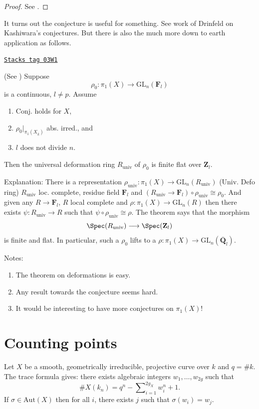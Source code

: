 \begin{proof}
See \cite{Gaitsgory}.
\end{proof}

It turns out the conjecture is useful for something.
See work of Drinfeld on Kashiwara's conjectures. But there is also
the much more down to earth application as follows.

\begin{theorem}
\label{trace-theorem-deformation-rings}
\href{https://stacks.math.columbia.edu/tag/03W1}{\texttt{Stacks tag 03W1}}

(See \cite[Theorem 3.5]{dJ-conjecture})
Suppose
$$
\rho_0: \pi_1(X)\to \text{GL}_n(\mathbf{F}_l)
$$
is a continuous, $l\neq p$. Assume
\begin{enumerate}
\item Conj. holds for $X$,
\item $\rho_0 |_{\pi_1(X_{\overline{k}})}$ abs. irred., and
\item $l$ does not divide $n$.
\end{enumerate}
Then the universal deformation ring $R_{\text{univ}}$ of $\rho_0$ is
finite flat over $\mathbf{Z}_l$.
\end{theorem}

Explanation: There is a representation $\rho_{\text{univ}}:
\pi_1(X)\to \text{GL}_n(R_{\text{univ}})$ (Univ. Defo ring)
$R_{\text{univ}}$ loc.
complete, residue field $\mathbf{F}_l$ and $(R_{\text{univ}}\to
\mathbf{F}_l)\circ\rho_{\text{univ}}\cong\rho_0$.
And given any $R\to \mathbf{F}_l$, $R$ local complete and
$\rho : \pi_1(X)\to \text{GL}_n(R)$ then there exists
$\psi : R_{\text{univ}}\to R$ such that
$\psi\circ\rho_{\text{univ}}\cong \rho$. The theorem says that the morphism
$$
\Spec(R_{\text{univ}})
\longrightarrow
\Spec(\mathbf{Z}_l)
$$
is finite and flat. In particular, such a $\rho_0$
lifts to a $\rho : \pi_1(X) \to \text{GL}_n(\overline{\mathbf{Q}}_l)$.

\medskip\noindent
Notes:
\begin{enumerate}
\item The theorem on deformations is easy.
\item Any result towards the conjecture seems hard.
\item It would be interesting to have more conjectures on $\pi_1(X)$!
\end{enumerate}



\section{Counting points}
\label{trace-section-counting}
Let $X$ be a smooth, geometrically irreducible,
projective curve over $k$ and $q = \# k$. The trace formula gives:
there exists algebraic integers $w_1, \ldots, w_{2g}$ such that
$$
\# X(k_n) = q^n - \sum\nolimits_{i = 1}^{2g_X} w_i^n + 1.
$$
If $\sigma\in \text{Aut}(X)$ then for all $i$, there exists $j$ such that
$\sigma(w_i)=w_j$.

